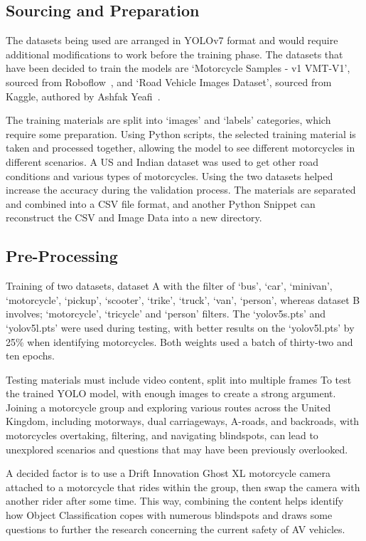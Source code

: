 \documentclass[conference]{IEEEtran}
\begin{document}
	\subsection{Sourcing and Preparation}
		The datasets being used are arranged in YOLOv7 format and would require additional modifications to work before the training phase. The datasets that have been decided to train the models are `Motorcycle Samples - v1 VMT-V1', sourced from Roboflow~\cite{roboflow_motorcycle_nodate}, and `Road Vehicle Images Dataset', sourced from Kaggle, authored by Ashfak Yeafi~\cite{ashfak_yeafi_road_nodate}.

		The training materials are split into `images' and `labels' categories, which require some preparation. Using Python scripts, the selected training material is taken and processed together, allowing the model to see different motorcycles in different scenarios. A US and Indian dataset was used to get other road conditions and various types of motorcycles. Using the two datasets helped increase the accuracy during the validation process. The materials are separated and combined into a CSV file format, and another Python Snippet can reconstruct the CSV and Image Data into a new directory.

	\subsection{Pre-Processing}
	\label{subsec:preprocessing}
	

		Training of two datasets, dataset A with the filter of `bus', `car', `minivan', `motorcycle', `pickup', `scooter', `trike', `truck', `van', `person', whereas dataset B involves; `motorcycle', `tricycle' and `person' filters. The `yolov5s.pts' and `yolov5l.pts' were used during testing, with better results on the `yolov5l.pts' by 25\% when identifying motorcycles. Both weights used a batch of thirty-two and ten epochs.

		Testing materials must include video content, split into multiple frames To test the trained YOLO model, with enough images to create a strong argument. Joining a motorcycle group and exploring various routes across the United Kingdom, including motorways, dual carriageways, A-roads, and backroads, with motorcycles overtaking, filtering, and navigating blindspots, can lead to unexplored scenarios and questions that may have been previously overlooked.
					
		A decided factor is to use a Drift Innovation Ghost XL motorcycle camera attached to a motorcycle that rides within the group, then swap the camera with another rider after some time. This way, combining the content helps identify how Object Classification copes with numerous blindspots and draws some questions to further the research concerning the current safety of AV vehicles. 
		
\end{document}
